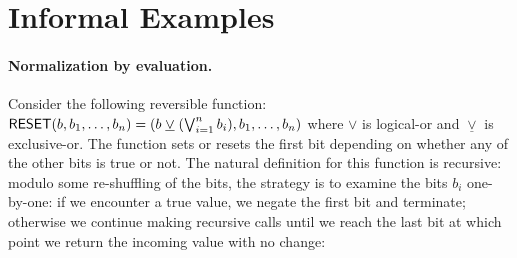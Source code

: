 \section{Informal Examples}
\label{sec:informal}





\paragraph*{Normalization by evaluation.} Consider the following reversible function:
$\Afun{RESET}(b,b_1,\ldots,b_n) = (b \; \underline{\vee} \; (\bigvee_{i=1}^n b_i),b_1,\ldots,b_n)$ where $\vee$ is
logical-or and $\underline{\vee}$ is exclusive-or. The function sets or resets the first bit depending on whether any of
the other bits is true or not. The natural definition for this function is recursive: modulo some re-shuffling of the
bits, the strategy is to examine the bits $b_i$ one-by-one: if we encounter a true value, we negate the first bit and
terminate; otherwise we continue making recursive calls until we reach the last bit at which point we return the
incoming value with no change:

